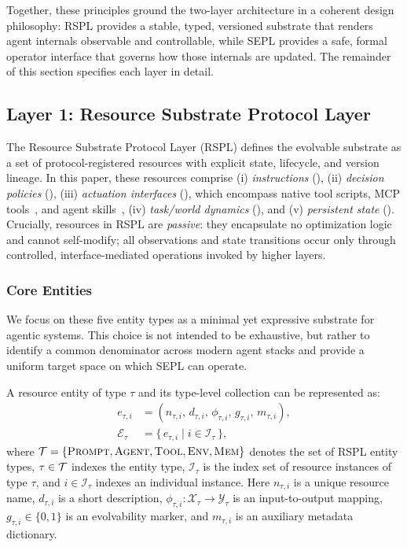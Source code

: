 Together, these principles ground the two-layer architecture in a coherent design philosophy: RSPL provides a stable, typed, versioned substrate that renders agent internals observable and controllable, while SEPL provides a safe, formal operator interface that governs how those internals are updated. The remainder of this section specifies each layer in detail.

\subsection{Layer 1: Resource Substrate Protocol Layer}

The Resource Substrate Protocol Layer (RSPL) defines the evolvable substrate as a set of protocol-registered resources with explicit state, lifecycle, and version lineage. In this paper, these resources comprise (i) \emph{instructions} (), (ii) \emph{decision policies} (), (iii) \emph{actuation interfaces} (), which encompass native tool scripts, MCP tools~\citep{anthropic2025}, and agent skills~\citep{anthropic2025agentskills}, (iv) \emph{task/world dynamics} (), and (v) \emph{persistent state} (). Crucially, resources in RSPL are \emph{passive}: they encapsulate no optimization logic and cannot self-modify; all observations and state transitions occur only through controlled, interface-mediated operations invoked by higher layers.

\subsubsection{Core Entities}

We focus on these five entity types as a minimal yet expressive substrate for agentic systems. This choice is not intended to be exhaustive, but rather to identify a common denominator across modern agent stacks and provide a uniform target space on which SEPL can operate.

\begin{definition}
\label{appx_def:resource-entity}
A resource entity of type $\tau$ and its type-level collection can be represented as:
\begin{equation}
\begin{aligned}
e_{\tau,i} &= (n_{\tau,i},\, d_{\tau,i},\, \phi_{\tau,i},\, g_{\tau,i},\, m_{\tau,i}),\\
\mathcal{E}_{\tau} &= \{\, e_{\tau,i} \mid i \in \mathcal{I}_{\tau} \,\},
\end{aligned}
\end{equation}
where $\mathcal{T} = \{\textsc{Prompt},\textsc{Agent},\textsc{Tool},\textsc{Env},\textsc{Mem}\}$ denotes the set of RSPL entity types, $\tau \in \mathcal{T}$ indexes the entity type, $\mathcal{I}_\tau$ is the index set of resource instances of type $\tau$, and $i \in \mathcal{I}_\tau$ indexes an individual instance. Here $n_{\tau,i}$ is a unique resource name, $d_{\tau,i}$ is a short description, $\phi_{\tau,i}:\mathcal{X}_{\tau} \rightarrow \mathcal{Y}_{\tau}$ is an input-to-output mapping, $g_{\tau,i} \in \{0,1\}$ is an evolvability marker, and $m_{\tau,i}$ is an auxiliary metadata dictionary.
\end{definition}

